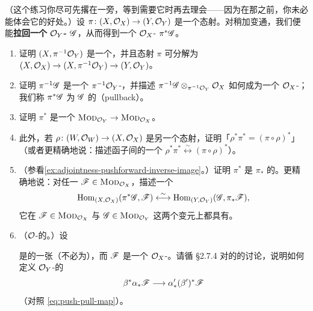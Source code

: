 \begin{exercise}\label{ex:pullback-ox-modules}
（这个练习你尽可先撂在一旁，等到需要它时再去理会——因为在那之前，你未必能体会它的好处。）设 $\pi\colon(X,\mathcal{O}_X)\to(Y,\mathcal{O}_Y)$ 是一个\trRingedSpace{}态射。对\trInverseImage{}稍加变通，我们便能\textbf{拉回一个 $\mathcal{O}_Y$-\trModule{} $\mathscr{G}$}，从而得到一个 $\mathcal{O}_X$-\trModule{} $\pi^*\mathscr{G}$。
\begin{enumerate}[label=(\alph*)]
\item 证明 $(X,\pi^{-1}\mathcal{O}_Y)$ 是一个\trRingedSpace，并且\trRingedSpace{}态射 $\pi$ 可分解为 $(X,\mathcal{O}_X)\to(X,\pi^{-1}\mathcal{O}_Y)\to(Y,\mathcal{O}_Y)$。
\item 证明 $\pi^{-1}\mathscr{G}$ 是一个 $\pi^{-1}\mathcal{O}_Y$-\trModule，并描述 $\pi^{-1}\mathscr{G}\otimes_{\pi^{-1}\mathcal{O}_Y}\mathcal{O}_X$ 如何成为一个 $\mathcal{O}_X$-\trModule{}；我们称 $\pi^*\mathscr{G}$ 为 $\mathscr{G}$ 的\textbf{\trPullback}（pullback）。
\item 证明 $\pi^*$ 是一个\trCovariantFunctor{} $\textsc{Mod}_{\mathcal{O}_Y}\to\textsc{Mod}_{\mathcal{O}_X}$。
\item 此外，若 $\rho\colon(W,\mathcal{O}_W)\to(X,\mathcal{O}_X)$ 是另一个\trRingedSpace{}态射，证明「$\rho^*\pi^*=(\pi\circ\rho)^*$」（或者更精确地说：描述函子间的一个\trNaturalIsomorphism{} $\rho^*\pi^*\overset{\sim}{\longleftrightarrow}(\pi\circ\rho)^*$）。
\item（参看\cref{ex:adjointness-pushforward-inverse-image}。）证明 $\pi^*$ 是 $\pi_*$ 的\trLeftAdjoint。更精确地说：对任一 $\mathscr{F}\in\textsc{Mod}_{\mathcal{O}_X}$，描述一个\trNatural\trBijection
\[
\operatorname{Hom}_{(X,\mathcal{O}_X)}(\pi^*\mathscr{G},\mathscr{F})
\overset{\sim}{\longleftrightarrow}
\operatorname{Hom}_{(Y,\mathcal{O}_Y)}(\mathscr{G},\pi_*\mathscr{F}),
\]
它在 $\mathscr{F}\in\textsc{Mod}_{\mathcal{O}_X}$ 与 $\mathscr{G}\in\textsc{Mod}_{\mathcal{O}_Y}$ 这两个变元上都具有\trFunctoriality。
\item（$\mathcal{O}$-\trModule{}的\trPushPullMap。）设
是\emph{\trRingedSpace}的一张\trCommutativeDiagram{}（不必为\trCartesianDiagram），而 $\mathscr{F}$ 是一个 $\mathcal{O}_X$-\trModule。请循 \S2.7.4 对\trSheaf{}的\trPushPullMap{}的讨论，说明如何定义 $\mathcal{O}_Y$-\trModule{}的\textbf{\trPushPullMap}
\[
\beta^*\alpha_*\mathscr{F}\longrightarrow\alpha'_*(\beta')^*\mathscr{F}
\]
（对照 \eqref{eq:push-pull-map}）。
\end{enumerate}
\end{exercise}


